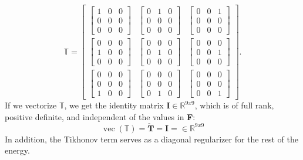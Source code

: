 {{{\[\mathbb{T} = \left[\begin{array}{ccc}{\begin{bmatrix} 1 & 0 & 0 \\ 0 & 0 & 0 \\ 0 & 0 & 0 \end{bmatrix}} & {\begin{bmatrix} 0 & 1 & 0 \\ 0 & 0 & 0 \\ 0 & 0 & 0 \end{bmatrix}} & {\begin{bmatrix} 0 & 0 & 1 \\ 0 & 0 & 0 \\ 0 & 0 & 0 \end{bmatrix}} \\ {\begin{bmatrix} 0 & 0 & 0 \\ 1 & 0 & 0 \\ 0 & 0 & 0 \end{bmatrix}} & {\begin{bmatrix} 0 & 0 & 0 \\ 0 & 1 & 0 \\ 0 & 0 & 0 \end{bmatrix}} & {\begin{bmatrix} 0 & 0 & 0 \\ 0 & 0 & 1 \\ 0 & 0 & 0 \end{bmatrix}} \\ {\begin{bmatrix} 0 & 0 & 0 \\ 0 & 0 & 0 \\ 1 & 0 & 0 \end{bmatrix}} & {\begin{bmatrix} 0 & 0 & 0 \\ 0 & 0 & 0 \\ 0 & 1 & 0 \end{bmatrix}} & {\begin{bmatrix} 0 & 0 & 0 \\ 0 & 0 & 0 \\ 0 & 0 & 1 \end{bmatrix}} \end{array}\right].
\]
If we vectorize $\mathbb{T}$, we get the identity matrix $\mathbf{I} \in \mathbb{R}^{9x9}$, which is of full rank, positive definite, and independent of the values in \textbf{F}: 
\[
\operatorname{vec}(\mathbb{T}) =  \mathbf{\check{T}} = \mathbf{I} = \in \mathbb{R}^{9x9}
\]
In addition, the Tikhonov term serves as a diagonal regularizer for the rest of the energy.

}}}
